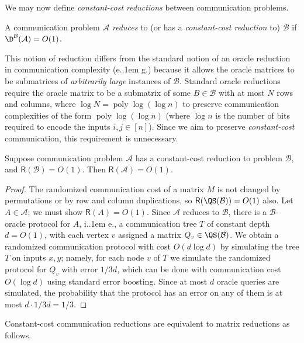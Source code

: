 \documentclass{article}
\makeatletter
\DeclareMathOperator{\poly}{poly}
\newcommand{\cA}{\ensuremath{\mathcal{A}}}
\newcommand{\cB}{\ensuremath{\mathcal{B}}}
\newcommand*\ie{i.\kern.1em e.\@\xspace} %
\newcommand*\eg{e.\kern.1em g.\@\xspace} %
\newcommand{\CC}{\mathsf{R}}
\makeatother
\begin{document}
We may now define \emph{constant-cost reductions} between communication problems.

\begin{definition}
\label{def:constant-cost-reductions}
A communication problem $\cA$ \emph{reduces} to (or has a \emph{constant-cost reduction} to) $\cB$
if $\D^\cB(\cA) = O(1)$.
\end{definition}

\begin{remark}
This notion of reduction differs from the standard notion of an oracle reduction in communication
complexity (\eg \cite{BFS86}) because it allows the oracle matrices to be submatrices of
\emph{arbitrarily large} instances of $\cB$. Standard oracle reductions require the oracle matrix to
be a submatrix of some $B \in \cB$ with at most $N$ rows and columns, where $\log N = \poly\log(\log
n)$ to preserve communication complexities of the form $\poly\log(\log n)$ (where $\log n$ is the
number of bits required to encode the inputs $i,j \in [n]$). Since we aim to preserve
\emph{constant-cost} communication, this requirement is unnecessary.
\end{remark}

\begin{proposition}
Suppose communication problem $\cA$ has a constant-cost reduction to problem $\cB$, and $\CC(\cB) = O(1)$.
Then $\CC(\cA) = O(1)$.
\end{proposition}
\begin{proof}
The randomized communication cost of a matrix $M$ is not changed by permutations or
by row and column duplications, so $\CC(\QS(\cB)) = O(1)$ also. Let $A \in \cA$; we must show $\CC(A) =
O(1)$. Since $\cA$ reduces to $\cB$, there is a
$\cB$-oracle protocol for $A$, \ie,
a communication tree $T$ of constant depth $d = O(1)$, with
each vertex $v$ assigned a matrix $Q_v \in \QS(\cB)$. We obtain a randomized communication protocol
with cost $O(d \log d)$ by simulating the tree $T$ on inputs $x,y$; namely, for each node $v$ of $T$ we simulate
the randomized protocol for $Q_v$ with error $1/3d$, which can be done with communication cost
$O(\log d)$ using standard error boosting. Since at most $d$ oracle queries are simulated,
the probability that the protocol has an error on any of them is at most $d \cdot 1/3d = 1/3$.
\end{proof}

Constant-cost communication reductions are equivalent to matrix reductions as follows.
\end{document}
